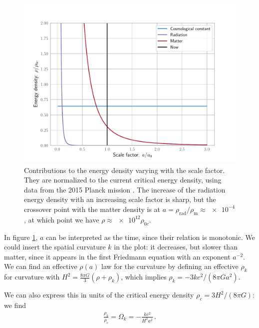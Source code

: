 \documentclass[main.tex]{subfiles}
\begin{document}
\begin{figure}[ht]
\centering
\includegraphics[width=\textwidth]{figures/global_energy_contributions.pdf}
\caption{Contributions to the energy density varying with the scale factor. They are normalized to the current critical energy density, using data from the 2015 Planck mission \cite{PlanckCollaboration:2016XIII}. The increase of the radiation energy density with an increasing scale factor is sharp, but the crossover point with the matter density is at \(a = \rho_{\text{rad}}/\rho_{\text{m}} \approx \num{e-4}\), at which point we have \(\rho \approx \num{e12} \rho_{0c}\).}
\label{fig:global_energy_contributions}
\end{figure}

In figure \ref{fig:global_energy_contributions}, \(a\) can be interpreted as the time, since their relation is monotonic.
We could insert the spatial curvature \(k\) in the plot: it decreases, but slower than matter, since it appears in the first Friedmann equation with an exponent \(a^{-2}\).
We can find an effective \(\rho (a)\) law for the curvature by defining an effective \(\rho_{k}\) for curvature with \(H^2 = \frac{8 \pi G}{3} (\rho + \rho_{k})\), which implies \(\rho_{k} = - 3 k c^2 / (8 \pi G a^2)\). 

We can also express this in units of the critical energy density \(\rho_{c} = 3 H^2 / (8 \pi G)\): we find 
%
\begin{align} \label{eq:spatial-curvature-effective-density}
\frac{\rho_{k}}{\rho_{c}} = \Omega_{k} = - \frac{kc^2}{H^2a^2}
\,.
\end{align}
\end{document}
